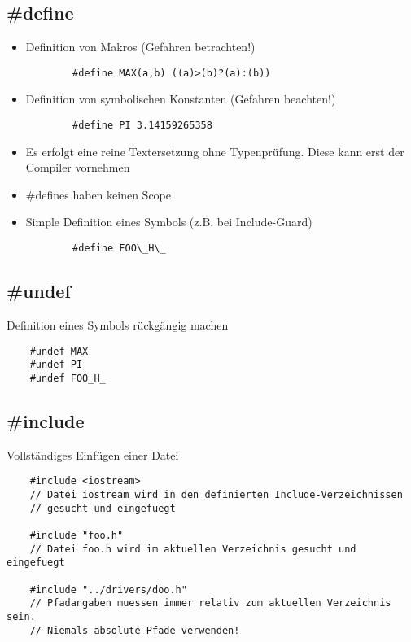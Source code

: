 \subsection{\#define}
\label{sec:define}
\begin{itemize}
	\item Definition von Makros (Gefahren betrachten!)\\
	\noindent
	\begin{minipage}{\linewidth}
		\begin{lstlisting}
		#define MAX(a,b) ((a)>(b)?(a):(b))	
		\end{lstlisting}
	\end{minipage}
	\item Definition von symbolischen Konstanten (Gefahren beachten!)\\
	\noindent
	\begin{minipage}{\linewidth}
		\begin{lstlisting}
		#define PI 3.14159265358
		\end{lstlisting}
	\end{minipage}
	\item Es erfolgt eine reine Textersetzung ohne Typenprüfung. Diese kann erst der Compiler vornehmen
	\item \#defines haben keinen Scope
	\item Simple Definition eines Symbols (z.B. bei Include-Guard)\\
	\noindent
	\begin{minipage}{\linewidth}
		\begin{lstlisting}
		#define FOO\_H\_
		\end{lstlisting}
	\end{minipage}
\end{itemize}

\subsection{\#undef}
\label{sec:undef}
Definition eines Symbols rückgängig machen
\noindent
\begin{minipage}{\linewidth}
	\begin{lstlisting}
	#undef MAX
	#undef PI
	#undef FOO_H_
	\end{lstlisting}
\end{minipage}

\subsection{\#include}
\label{sec:include}
Vollständiges Einfügen einer Datei
\noindent
\begin{minipage}{\linewidth}
	\begin{lstlisting}
	#include <iostream>
	// Datei iostream wird in den definierten Include-Verzeichnissen
	// gesucht und eingefuegt
	
	#include "foo.h"
	// Datei foo.h wird im aktuellen Verzeichnis gesucht und eingefuegt
	
	#include "../drivers/doo.h"
	// Pfadangaben muessen immer relativ zum aktuellen Verzeichnis sein.
	// Niemals absolute Pfade verwenden!
	\end{lstlisting}
\end{minipage}

